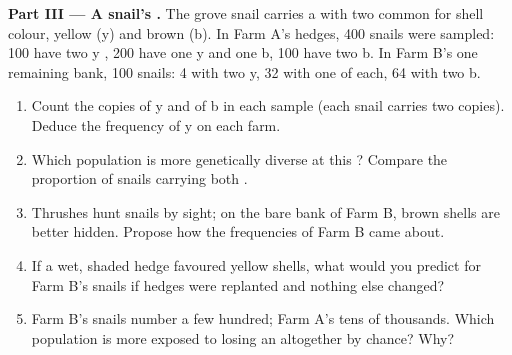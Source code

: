 \begin{problem}
\medskip
\noindent\textbf{Part III --- A snail's .}
The grove snail carries a  with two common  for shell
colour, yellow (y) and brown (b). In Farm A's hedges, 400 snails were
sampled: 100 have two y , 200 have one y and one b, 100 have two
b. In Farm B's one remaining bank, 100 snails: 4 with two y, 32 with
one of each, 64 with two b.
\begin{enumerate}[resume]
  \item Count the copies of y and of b in each sample (each snail
        carries two copies). Deduce the frequency of y on each farm.
  \item Which population is more genetically diverse at this ?
        Compare the proportion of snails carrying both .
  \item Thrushes hunt snails by sight; on the bare bank of Farm B,
        brown shells are better hidden. Propose how the frequencies
        of Farm B came about.
  \item If a wet, shaded hedge favoured yellow shells, what would you
        predict for Farm B's snails if hedges were replanted and
        nothing else changed?
  \item Farm B's snails number a few hundred; Farm A's tens of
        thousands. Which population is more exposed to losing an
         altogether by chance? Why?
\end{enumerate}


\end{problem}
